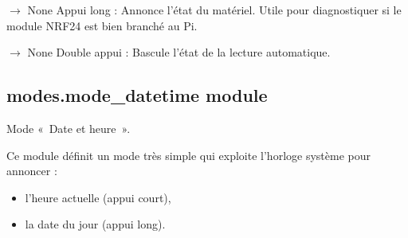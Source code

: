 \documentclass[letterpaper,10pt,french]{sphinxmanual}
\begin{document}
\begin{fulllineitems}

\begin{fulllineitems}
\label{\detokenize{api/modes:modes.mode_caliper.ModeCaliper.on_long_press}}
\pysigstartsignatures
\pysiglinewithargsret
{}
{}
{{ $\rightarrow$ None}}
\pysigstopsignatures
\sphinxAtStartPar
Appui long : Annonce l’état du matériel.
Utile pour diagnostiquer si le module NRF24 est bien branché au Pi.

\end{fulllineitems}


\begin{fulllineitems}
\label{\detokenize{api/modes:modes.mode_caliper.ModeCaliper.on_double_press}}
\pysigstartsignatures
\pysiglinewithargsret
{}
{}
{{ $\rightarrow$ None}}
\pysigstopsignatures
\sphinxAtStartPar
Double appui : Bascule l’état de la lecture automatique.

\end{fulllineitems}


\end{fulllineitems}



\subsection{modes.mode\_datetime module}
\label{\detokenize{api/modes:module-modes.mode_datetime}}\label{\detokenize{api/modes:modes-mode-datetime-module}}
\sphinxAtStartPar
Mode « Date et heure ».

\sphinxAtStartPar
Ce module définit un mode très simple qui exploite l’horloge système
pour annoncer :
\begin{itemize}
\item {} 
\sphinxAtStartPar
l’heure actuelle (appui court),

\item {} 
\sphinxAtStartPar
la date du jour (appui long).

\end{itemize}
\end{document}
